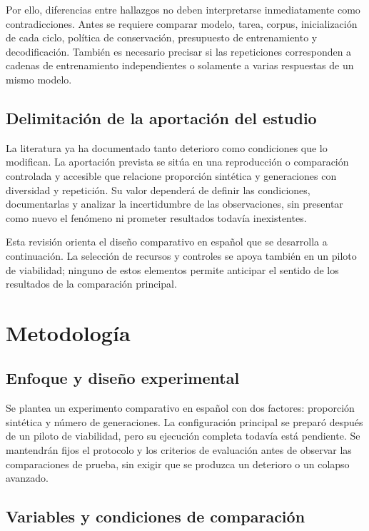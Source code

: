 \documentclass[12pt,letterpaper]{article}
\begin{document}
Por ello, diferencias entre hallazgos no deben interpretarse inmediatamente
como contradicciones. Antes se requiere comparar modelo, tarea, corpus,
inicialización de cada ciclo, política de conservación, presupuesto de
entrenamiento y decodificación. También es necesario precisar si las
repeticiones corresponden a cadenas de entrenamiento independientes o
solamente a varias respuestas de un mismo modelo.

\subsection{Delimitación de la aportación del estudio}

La literatura ya ha documentado tanto deterioro como condiciones que lo
modifican. La aportación prevista se sitúa en una reproducción o comparación
controlada y accesible que relacione proporción sintética y generaciones
con diversidad y repetición. Su valor dependerá de definir las condiciones,
documentarlas y analizar la incertidumbre de las observaciones, sin
presentar como nuevo el fenómeno ni prometer resultados todavía inexistentes.

Esta revisión orienta el diseño comparativo en español que se desarrolla
a continuación. La selección de recursos y controles se apoya también en
un piloto de viabilidad; ninguno de estos elementos permite anticipar el
sentido de los resultados de la comparación principal.

\section{Metodología}

\subsection{Enfoque y diseño experimental}

Se plantea un experimento comparativo en español con dos factores:
proporción sintética y número de generaciones. La configuración principal
se preparó después de un piloto de viabilidad, pero su ejecución completa
todavía está pendiente. Se mantendrán fijos el protocolo y los criterios de
evaluación antes de observar las comparaciones de prueba, sin exigir que
se produzca un deterioro o un colapso avanzado.

\subsection{Variables y condiciones de comparación}
\end{document}
